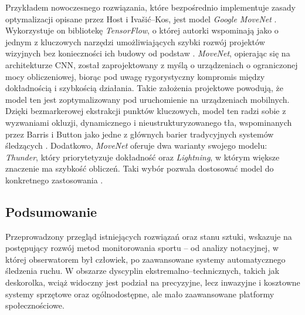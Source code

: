         Przykładem nowoczesnego rozwiązania, które bezpośrednio implementuje zasady optymalizacji opisane przez Host i Ivašić–Kos, jest model \textit{Google MoveNet} \cite{movenet2021}. Wykorzystuje on bibliotekę \textit{TensorFlow}, o której autorki wspominają jako o jednym z kluczowych narzędzi umożliwiających szybki rozwój projektów wizyjnych bez konieczności ich budowy od podstaw \cite{host2022overview}. \textit{MoveNet}, opierając się na architekturze CNN, został zaprojektowany z myślą o urządzeniach o ograniczonej mocy obliczeniowej, biorąc pod uwagę rygorystyczny kompromis między dokładnością i szybkością działania. Takie założenia projektowe powodują, że model ten jest zoptymalizowany pod uruchomienie na urządzeniach mobilnych. Dzięki bezmarkerowej ekstrakcji punktów kluczowych, model ten radzi sobie z wyzwaniami okluzji, dynamicznego i nieustrukturyzowanego tła, wspominanych przez Barris i Button jako jedne z głównych barier tradycyjnych systemów śledzących \cite{barris2008review}. Dodatkowo, \textit{MoveNet} oferuje dwa warianty swojego modelu: \textit{Thunder}, który priorytetyzuje dokładność oraz \textit{Lightning}, w którym większe znaczenie ma szybkość obliczeń. Taki wybór pozwala dostosować model do konkretnego zastosowania \cite{movenet2021}.
        
    \subsection{Podsumowanie}
        Przeprowadzony przegląd istniejących rozwiązań oraz stanu sztuki, wskazuje na postępujący rozwój metod monitorowania sportu – od analizy notacyjnej, w której obserwatorem był człowiek, po zaawansowane systemy automatycznego śledzenia ruchu. W obszarze dyscyplin ekstremalno–technicznych, takich jak deskorolka, wciąż widoczny jest podział na precyzyjne, lecz inwazyjne i kosztowne systemy sprzętowe oraz ogólnodostępne, ale mało zaawansowane platformy społecznościowe.

